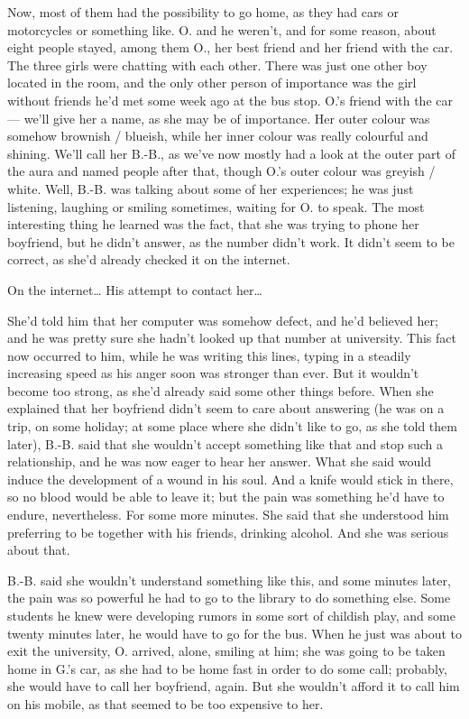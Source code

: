Now, most of them had the possibility to go home, as they had cars or motorcycles or something like. 
O. and he weren't, and for some reason, about eight people stayed, among them O., her best friend and her friend with the car. 
The three girls were chatting with each other. There was just one other boy located in the room, and the only other person of importance was the girl without friends he'd met some week ago at the bus stop. 
O.'s friend with the car --- we'll give her a name, as she may be of importance. Her outer colour was somehow brownish / blueish, while her inner colour was really colourful and shining. 
We'll call her B.-B., as we've now mostly had a look at the outer part of the aura and named people after that, though O.'s outer colour was greyish / white. 
Well, B.-B. was talking about some of her experiences; he was just listening, laughing or smiling sometimes, waiting for O. to speak. 
The most interesting thing he learned was the fact, that she was trying to phone her boyfriend, but he didn't answer, as the number didn't work. It didn't seem to be correct, as she'd already checked it on the internet.

On the internet\dots{}
His attempt to contact her\dots{}

She'd told him that her computer was somehow defect, and he'd believed her; and he was pretty sure she hadn't looked up that number at university. 
This fact now occurred to him, while he was writing this lines, typing in a steadily increasing speed as his anger soon was stronger than ever. 
But it wouldn't become too strong, as she'd already said some other things before. When she explained that her boyfriend didn't seem to care about answering (he was on a trip, on some holiday; at some place where she didn't like to go, as she told them later), B.-B. said that she wouldn't accept something like that and stop such a relationship, and he was now eager to hear her answer. What she said would induce the development of a wound in his soul.
And a knife would stick in there, so no blood would be able to leave it; but the pain was something he'd have to endure, nevertheless. 
For some more minutes. 
She said that she understood him preferring to be together with his friends, drinking alcohol. 
And she was serious about that.

B.-B. said she wouldn't understand something like this, and some minutes later, the pain was so powerful he had to go to the library to do something else. 
Some students he knew were developing rumors in some sort of childish play, and some twenty minutes later, he would have to go for the bus. When he just was about to exit the university, O. arrived, alone, smiling at him; she was going to be taken home in G.'s car, as she had to be home fast in order to do some call; probably, she would have to call her boyfriend, again. 
But she wouldn't afford it to call him on his mobile, as that seemed to be too expensive to her.

